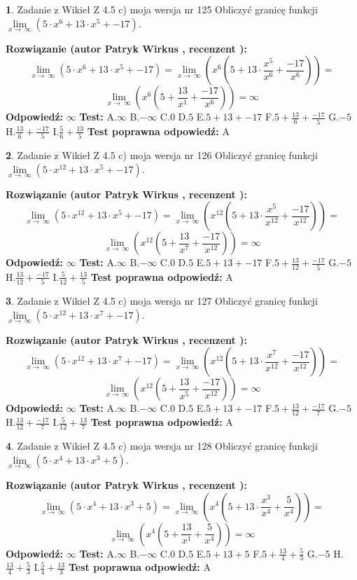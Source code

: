 \documentclass[12pt, a4paper]{article}
\theoremstyle{definition} %
\newtheorem{zad}{}
\newcommand{\zadStart}[1]{\begin{zad}#1\newline}
\newcommand{\zadStop}{\end{zad}}
\newcommand{\rozwStart}[2]{\noindent \textbf{Rozwiązanie (autor #1 , recenzent #2): }\newline}
\newcommand{\rozwStop}{\newline}
\newcommand{\odpStart}{\noindent \textbf{Odpowiedź:}\newline}
\newcommand{\odpStop}{\newline}
\newcommand{\testStart}{\noindent \textbf{Test:}\newline}
\newcommand{\testStop}{\newline}
\newcommand{\kluczStart}{\noindent \textbf{Test poprawna odpowiedź:}\newline}
\newcommand{\kluczStop}{\newline}
\begin{document}
\zadStart{Zadanie z Wikieł Z 4.5 c) moja wersja nr 125}
Obliczyć granicę funkcji  $\lim\limits_{x\to\ \infty}(5 \cdot x^{6}+13 \cdot x^{5}+-17)$.
\zadStop
\rozwStart{Patryk Wirkus}{}
$$\lim\limits_{x\to\ \infty}(5 \cdot x^{6}+13 \cdot x^{5}+-17) = \lim\limits_{x\to\ \infty}(x^{6}(5 +13 \cdot \frac{x^{5}}{x^{6}}+\frac{-17}{x^{6}})) =$$ $$\lim\limits_{x\to\ \infty}(x^{6}(5 +\frac{13}{x^{1}}+\frac{-17}{x^{6}})) =\infty$$
\rozwStop
\odpStart
$\infty$
\odpStop
\testStart
A.$\infty$ B.$-\infty$ C.$0$ D.$5$ E.$5 + 13 + -17$
F.$5+\frac{13}{6}+\frac{-17}{5}$ G.$-5$
H.$\frac{13}{6}+\frac{-17}{5}$
I.$\frac{5}{6}+\frac{13}{5}$
\testStop
\kluczStart
A
\kluczStop



\zadStart{Zadanie z Wikieł Z 4.5 c) moja wersja nr 126}
Obliczyć granicę funkcji  $\lim\limits_{x\to\ \infty}(5 \cdot x^{12}+13 \cdot x^{5}+-17)$.
\zadStop
\rozwStart{Patryk Wirkus}{}
$$\lim\limits_{x\to\ \infty}(5 \cdot x^{12}+13 \cdot x^{5}+-17) = \lim\limits_{x\to\ \infty}(x^{12}(5 +13 \cdot \frac{x^{5}}{x^{12}}+\frac{-17}{x^{12}})) =$$ $$\lim\limits_{x\to\ \infty}(x^{12}(5 +\frac{13}{x^{7}}+\frac{-17}{x^{12}})) =\infty$$
\rozwStop
\odpStart
$\infty$
\odpStop
\testStart
A.$\infty$ B.$-\infty$ C.$0$ D.$5$ E.$5 + 13 + -17$
F.$5+\frac{13}{12}+\frac{-17}{5}$ G.$-5$
H.$\frac{13}{12}+\frac{-17}{5}$
I.$\frac{5}{12}+\frac{13}{5}$
\testStop
\kluczStart
A
\kluczStop



\zadStart{Zadanie z Wikieł Z 4.5 c) moja wersja nr 127}
Obliczyć granicę funkcji  $\lim\limits_{x\to\ \infty}(5 \cdot x^{12}+13 \cdot x^{7}+-17)$.
\zadStop
\rozwStart{Patryk Wirkus}{}
$$\lim\limits_{x\to\ \infty}(5 \cdot x^{12}+13 \cdot x^{7}+-17) = \lim\limits_{x\to\ \infty}(x^{12}(5 +13 \cdot \frac{x^{7}}{x^{12}}+\frac{-17}{x^{12}})) =$$ $$\lim\limits_{x\to\ \infty}(x^{12}(5 +\frac{13}{x^{5}}+\frac{-17}{x^{12}})) =\infty$$
\rozwStop
\odpStart
$\infty$
\odpStop
\testStart
A.$\infty$ B.$-\infty$ C.$0$ D.$5$ E.$5 + 13 + -17$
F.$5+\frac{13}{12}+\frac{-17}{7}$ G.$-5$
H.$\frac{13}{12}+\frac{-17}{7}$
I.$\frac{5}{12}+\frac{13}{7}$
\testStop
\kluczStart
A
\kluczStop



\zadStart{Zadanie z Wikieł Z 4.5 c) moja wersja nr 128}
Obliczyć granicę funkcji  $\lim\limits_{x\to\ \infty}(5 \cdot x^{4}+13 \cdot x^{3}+5)$.
\zadStop
\rozwStart{Patryk Wirkus}{}
$$\lim\limits_{x\to\ \infty}(5 \cdot x^{4}+13 \cdot x^{3}+5) = \lim\limits_{x\to\ \infty}(x^{4}(5 +13 \cdot \frac{x^{3}}{x^{4}}+\frac{5}{x^{4}})) =$$ $$\lim\limits_{x\to\ \infty}(x^{4}(5 +\frac{13}{x^{1}}+\frac{5}{x^{4}})) =\infty$$
\rozwStop
\odpStart
$\infty$
\odpStop
\testStart
A.$\infty$ B.$-\infty$ C.$0$ D.$5$ E.$5 + 13 + 5$
F.$5+\frac{13}{4}+\frac{5}{3}$ G.$-5$
H.$\frac{13}{4}+\frac{5}{3}$
I.$\frac{5}{4}+\frac{13}{3}$
\testStop
\kluczStart
A
\kluczStop
\end{document}
